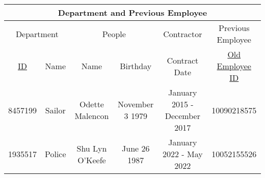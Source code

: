 \documentclass[12pt]{article}
\begin{document}
\begin{center}
    \begin{tabular}{|c|c||c|c||c||c|}
        \hline
        \multicolumn{6}{|c|}{\cellcolor{gray!25}Department and Previous Employee}                                                                  \\
        \hline
        \hline
        \multicolumn{2}{|c||}{\cellcolor{gray!25}Department}
                & \multicolumn{2}{c||}{\cellcolor{gray!25}People}
                & {\cellcolor{gray!25}Contractor}
                & {\cellcolor{gray!25}Previous Employee}                                                                                           \\
        \hline
        \cellcolor{gray!25} \underline{ID}
                & \cellcolor{gray!25}Name
                & \cellcolor{gray!25}Name
                & \cellcolor{gray!25}Birthday
                & \cellcolor{gray!25}Contract Date
                & \cellcolor{gray!25}\underline{Old Employee ID}                                                                                   \\
        \hline \hline
        8457199 & Sailor                                          & Odette Malencon & November 3 1979 & January 2015 - December 2017 & 10090218575 \\ \hline
        1935517 & Police                                          & Shu Lyn O'Keefe & June 26 1987    & January 2022 - May 2022      & 10052155526 \\ \hline
    \end{tabular}
\end{center}
\end{document}
